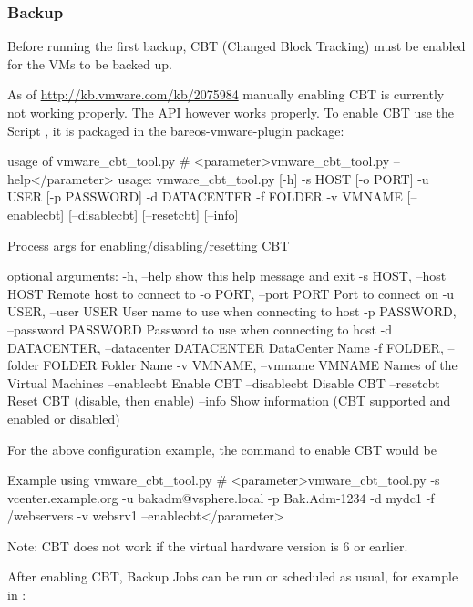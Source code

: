 \subsubsection{Backup}

Before running the first backup, CBT (Changed Block Tracking) must be
enabled for the VMs to be backed up.

As of \url{http://kb.vmware.com/kb/2075984} manually enabling CBT is
currently not working properly. The API however works properly.
To enable CBT use the Script , it is packaged
in the bareos-vmware-plugin package:

\begin{commands}{usage of vmware\_cbt\_tool.py}
# <parameter>vmware_cbt_tool.py --help</parameter>
usage: vmware_cbt_tool.py [-h] -s HOST [-o PORT] -u USER [-p PASSWORD] -d
                          DATACENTER -f FOLDER -v VMNAME [--enablecbt]
                          [--disablecbt] [--resetcbt] [--info]

Process args for enabling/disabling/resetting CBT

optional arguments:
  -h, --help            show this help message and exit
  -s HOST, --host HOST  Remote host to connect to
  -o PORT, --port PORT  Port to connect on
  -u USER, --user USER  User name to use when connecting to host
  -p PASSWORD, --password PASSWORD
                        Password to use when connecting to host
  -d DATACENTER, --datacenter DATACENTER
                        DataCenter Name
  -f FOLDER, --folder FOLDER
                        Folder Name
  -v VMNAME, --vmname VMNAME
                        Names of the Virtual Machines
  --enablecbt           Enable CBT
  --disablecbt          Disable CBT
  --resetcbt            Reset CBT (disable, then enable)
  --info                Show information (CBT supported and enabled or
                        disabled)
\end{commands}

For the above configuration example, the command to enable CBT would be

\begin{commands}{Example using vmware\_cbt\_tool.py}
# <parameter>vmware_cbt_tool.py -s vcenter.example.org -u bakadm@vsphere.local -p Bak.Adm-1234 -d mydc1 -f /webservers -v websrv1 --enablecbt</parameter>
\end{commands}

Note: CBT does not work if the virtual hardware version is 6 or earlier.

After enabling CBT, Backup Jobs can be run or scheduled as usual,
for example in :

